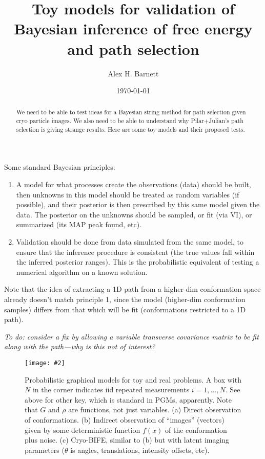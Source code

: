 \documentclass[10pt]{article}
\newcommand{\ben}{\begin{enumerate}}
\newcommand{\een}{\end{enumerate}}
\newcommand{\bfi}{\begin{figure}}
\newcommand{\efi}{\end{figure}}
\newcommand{\ca}[2]{\caption{#1 \label{#2}}}
\newcommand{\ig}[2]{\texttt{[image: \#2]}}
\begin{document}
\title{Toy models for validation of Bayesian inference of free energy and path selection}

\author{Alex H. Barnett}
\date{\today}
\maketitle

\begin{abstract}
  We need to be able to test ideas for a Bayesian string method for path selection given cryo particle images.
  We also need to be able to understand why Pilar+Julian's path selection is giving strange results.
  Here are some toy models and their proposed tests.
\end{abstract}

Some standard Bayesian principles:
\ben
\item
A model for what processes create the observations (data)
should be built, then unknowns in this model should be treated as
random variables (if possible), and their posterior is then
prescribed by this same model given the data. The posterior on the unknowns
should be sampled, or fit (via VI), or summarized (its MAP peak found, etc).
\item
Validation should be done from data simulated from the same model,
to ensure that the inference procedure is consistent (the true values
fall within the inferred posterior ranges). This is the
probabilistic
equivalent of testing a numerical algorithm on a known solution.
\een

Note that the idea of extracting a 1D path from a higher-dim conformation
space
already doesn't match principle 1, since the model (higher-dim conformation samples)
differs from that which will be fit (conformations restricted to a 1D path).

{\em To do: consider a fix by allowing a variable transverse covariance matrix to
be fit along with the path---why is this not of interest?}





\bfi[t]
\ig{width=6in}{graphs}
\ca{Probabilistic graphical models for toy and real problems.
  A box with $N$ in the corner indicates iid repeated measurements
  $i=1,\dots,N$. See above for other key, which is standard in PGMs, apparently.
  Note that $G$ and $\rho$ are functions, not just variables.
  (a) Direct observation of conformations. (b) Indirect observation
  of ``images'' (vectors) given by some deterministic function $f(x)$ of the conformation
  plus noise. (c) Cryo-BIFE, similar to (b) but with latent imaging parameters
  ($\theta$ is angles, translations, intensity offsets, etc).
  }{f:graphs}
\efi
\end{document}
